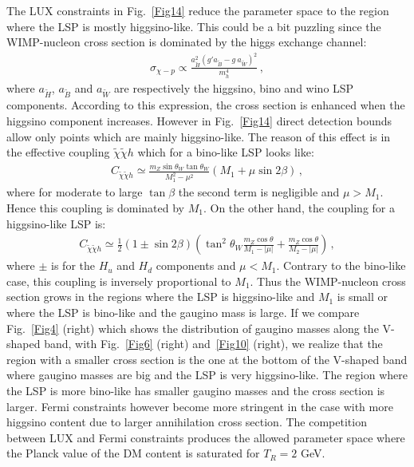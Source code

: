 \documentclass[12pt,a4paper]{book}
\begin{document}
The LUX constraints in Fig.~\ref{Fig14} reduce the parameter space to the region where the LSP is mostly higgsino-like. This could be a bit puzzling since the WIMP-nucleon cross section is dominated by the higgs exchange channel:
\begin{align}
\sigma_{\chi-p} \propto \frac{a_{\tilde H}^2 (g' a_{\tilde B} - g \ a_{\tilde W})^2}{m_h^4}\,,
\label{xip}
\end{align}
where $a_{\tilde H}$, $a_{\tilde B}$ and $a_{\tilde W}$ are respectively the higgsino, bino and wino LSP components. According to this expression, the cross section is enhanced when the higgsino component increases. However in Fig.~\ref{Fig14} direct detection bounds allow only points which are mainly higgsino-like. The reason of this effect is in the effective coupling $\tilde{\chi} \tilde{\chi}  h$ which for a bino-like LSP looks like:
\begin{align}
C_{\tilde{\chi}\tilde{\chi} h} \simeq \frac{m_Z \sin \theta_W \tan \theta_W}{M_1^2 -\mu^2}\left( M_1 + \mu \sin 2\beta \right)\,,
\label{Cb}
\end{align}
where for moderate to large $\tan \beta$ the second term is negligible and $\mu > M_1$. Hence this coupling is dominated by $M_1$. On the other hand, the coupling for a higgsino-like LSP is:
\begin{align}
C_{\tilde{\chi}\tilde{\chi} h} \simeq \frac{1}{2}\left( 1 \pm \sin 2\beta  \right)\left( \tan^2 \theta_W\frac{m_Z \cos \theta}{M_1 - |\mu|} +\frac{m_Z \cos \theta}{M_2 - |\mu|} \right)\,,
\label{Cn}
\end{align}
where $\pm$ is for the $H_u$ and $H_d$ components and $\mu < M_1$. Contrary to the bino-like case, this coupling is inversely proportional to $M_1$. Thus the WIMP-nucleon cross section grows in the regions where the LSP is higgsino-like and $M_1$ is small or where the LSP is bino-like and the gaugino mass is large. If we compare Fig.~\ref{Fig4} (right) which shows the distribution of gaugino masses along the V-shaped band, with Fig.~\ref{Fig6} (right) and~\ref{Fig10} (right), we realize that the region with a smaller cross section is the one at the bottom of the V-shaped band where gaugino masses are big and the LSP is very higgsino-like. The region where the LSP is more bino-like has smaller gaugino masses and the cross section is larger. Fermi constraints however become more stringent in the case with more higgsino content due to larger annihilation cross section. The competition between LUX and Fermi constraints produces the allowed parameter space where the Planck value of the DM content is saturated for $T_R=2$ GeV.\\
\end{document}
